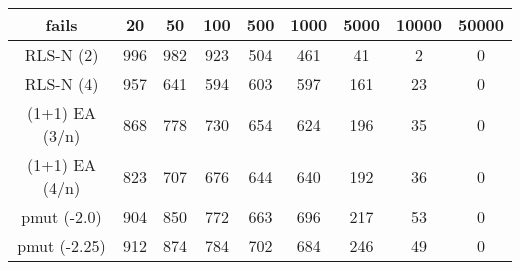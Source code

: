 \begin{tabular}[h]{ccccccccc}
fails&20&50&100&500&1000&5000&10000&50000\\\hline
RLS-N (2)&996&982&923&504&461&41&2&0\\
RLS-N (4)&957&641&594&603&597&161&23&0\\
(1+1) EA (3/n)&868&778&730&654&624&196&35&0\\
(1+1) EA (4/n)&823&707&676&644&640&192&36&0\\
pmut (-2.0)&904&850&772&663&696&217&53&0\\
pmut (-2.25)&912&874&784&702&684&246&49&0\\
\end{tabular}
